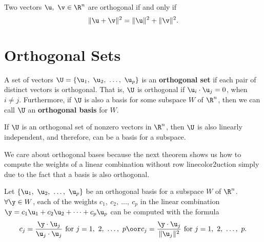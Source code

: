 \begin{theorem}
  \label{thm:the_pythagorean_theorem}

  Two vectors $\u,~\v \in \R^n$ are orthogonal if and only if
  \[%
    \Vert \u + \v \Vert^2 = \Vert \u \Vert^2 + \Vert \v \Vert^2
  .\]%
\end{theorem}


\section{Orthogonal Sets}
\label{sec:orthogonal_sets}

\begin{definition}
  \label{def:orthogonal_set_and_basis}

  A set of vectors $\U = \{\u_1,~\u_2,~\dots,~\u_p\}$ is an \textbf{orthogonal
  set} if each pair of distinct vectors is orthogonal. That is, $\U$ is
  orthogonal if $\u_i \cdot \u_j = 0$, when $i \ne j$. Furthermore, if $\U$ is
  also a basis for some subspace $W$ of $\R^n$, then we can call $\U$ an
  \textbf{orthogonal basis} for $W$.
\end{definition}

\begin{theorem}
  \label{thm:linearly_indenendent_orthogonal_basis}

  If $\U$ is an orthogonal set of nonzero vectors in $\R^n$, then $\U$ is also
  linearly independent, and therefore, can be a basis for a subspace.
\end{theorem}

We care about orthogonal bases because the next theorem shows us how to compute
the weights of a linear combination without row linecolor2uction simply due to the fact
that a basis is also orthogonal.

\begin{theorem}
  \label{thm:orthogonal_basis}

  Let $\{\u_1,~\u_2,~\dots,~\u_p\}$ be an orthogonal basis for a subspace $W$ of
  $\R^n$. $\forall \y \in W$, each of the weights $c_1,~c_2,~\dots,~c_p$ in the
  linear combination $\y = c_1\u_1 + c_2\u_2 + \cdots + c_p\u_p$ can be computed
  with the formula
  \[%
    c_j = \frac{\y \cdot \u_j}{\u_j \cdot \u_j}~\textrm{for}~j = 1,~2,~\dots,~p \oor c_j = \frac{\y \cdot \u_j}{\Vert \u_j \Vert^2}~\textrm{for}~j = 1,~2,~\dots,~p
  .\]%
\end{theorem}

